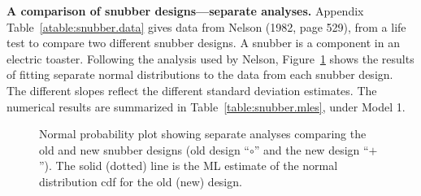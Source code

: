 \begin{example}
\label{example:snubber.separate}
{\bf A comparison of snubber designs---separate analyses.} Appendix
Table~\ref{atable:snubber.data} gives data from Nelson
(1982, page 529), 
from a life test to compare two different snubber designs.  A
snubber is a component in an electric toaster.  Following the analysis
used by Nelson, Figure~\ref{figure:snubber.indiv.norm.ps} shows the
results of fitting separate normal distributions to the data from
each snubber design.  The different slopes reflect the different
standard deviation estimates. The numerical results are summarized
in Table~\ref{table:snubber.mles}, under Model 1.
\end{example}
\begin{figure}
\caption{Normal probability plot showing separate analyses 
comparing the old and new snubber designs (old design ``$\circ$'' and
the new design ``$+$'').  The solid (dotted) line is the ML estimate
of the normal distribution cdf for the old (new) design.}
\label{figure:snubber.indiv.norm.ps}
\end{figure}
